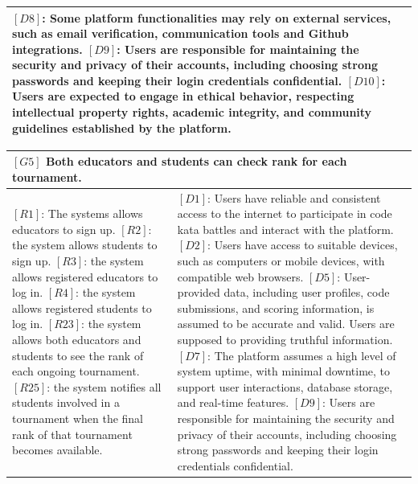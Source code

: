 \begin{table}[H]
\begin{tabular}{|p{8cm}|p{8cm}|}
{  \newline$[D8]$: Some platform functionalities may rely on external services, such as email verification, communication tools and Github integrations.
  \newline$[D9]$: Users are responsible for maintaining the security and privacy of their accounts, including choosing strong passwords and keeping their login credentials confidential.
  \newline$[D10]$: Users are expected to engage in ethical behavior, respecting intellectual property rights, academic integrity, and community guidelines established by the platform.
  }
  \\
  \hline
\end{tabular}
\end{table}

\begin{table}[H]
    \centering
\begin{tabular}{|p{8cm}|p{8cm}|}
  \hline
  \multicolumn{2}{|p{16cm}|}{\textbf{$[G5]$ Both educators and students can check rank for each tournament.}} \\
  \hline
  {
  $[R1]$: The systems allows educators to sign up.
  \newline$[R2]$: the system allows students to sign up.
  \newline$[R3]$: the system allows registered educators to log in.
  \newline$[R4]$: the system allows registered students to log in.
  \newline$[R23]$: the system allows both educators and students to see the rank of each ongoing tournament.
  \newline$[R25]$: the system notifies all students involved in a tournament when the final rank of that tournament becomes available.
  }
  & 
  {
  $[D1]$: Users have reliable and consistent access to the internet to participate in code kata battles and interact with the platform.
  \newline$[D2]$: Users have access to suitable devices, such as computers or mobile devices, with compatible web browsers.
  \newline$[D5]$: User-provided data, including user profiles, code submissions, and scoring information, is assumed to be accurate and valid. Users are supposed to providing truthful information.
  \newline$[D7]$: The platform assumes a high level of system uptime, with minimal downtime, to support user interactions, database storage, and real-time features.
  \newline$[D9]$: Users are responsible for maintaining the security and privacy of their accounts, including choosing strong passwords and keeping their login credentials confidential.
  }
  \\
  \hline
\end{tabular}
\end{table}

